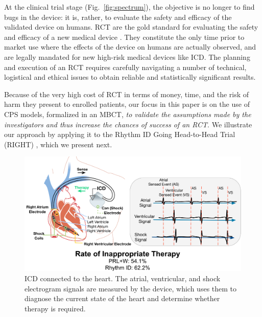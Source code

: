 At the clinical trial stage (Fig.~\ref{fig:spectrum}), the objective is no longer to find bugs in the device: it is, rather, to evaluate the safety and efficacy of the validated device on humans. 
RCT are the gold standard for evaluating the safety and efficacy of a new medical device \cite{FriedmanFD10_ClinicalTrials}.
They constitute the only time prior to market use where the effects of the device on humans are actually observed, and are legally mandated for new high-risk medical devices like ICD.
The planning and execution of an RCT requires carefully navigating a number of technical, logistical and ethical issues to obtain reliable and statistically significant results.

Because of the very high cost of RCT in terms of money, time, and the risk of harm they present to enrolled patients, our focus in this paper is on the use of CPS models, formalized in an MBCT, \emph{to validate the assumptions made by the investigators and thus increase the chances of success of an RCT}.
We illustrate our approach by applying it to the Rhythm ID Going Head-to-Head Trial (RIGHT) \cite{GoldABBTB11_RIGHTresults}, which we present next.
\begin{figure}[tb]
	\includegraphics[scale=0.6]{figures/figICD.pdf}
	\caption{ICD connected to the heart. The atrial, ventricular, and shock electrogram signals are measured by the device, which uses them to diagnose the current state of the heart and determine whether therapy is required.}
	\label{fig:icd}
\end{figure}

